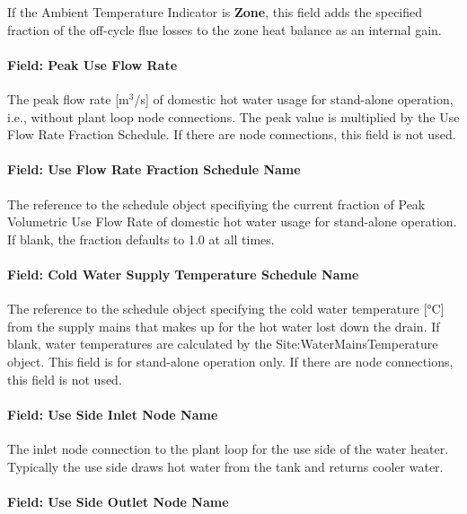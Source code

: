 If the Ambient Temperature Indicator is \textbf{Zone}, this field adds the specified fraction of the off-cycle flue losses to the zone heat balance as an internal gain.

\paragraph{Field: Peak Use Flow Rate}\label{field-peak-use-flow-rate-1}

The peak flow rate {[}m\(^{3}\)/s{]} of domestic hot water usage for stand-alone operation, i.e., without plant loop node connections. The peak value is multiplied by the Use Flow Rate Fraction Schedule. If there are node connections, this field is not used.

\paragraph{Field: Use Flow Rate Fraction Schedule Name}\label{field-use-flow-rate-fraction-schedule-name-1}

The reference to the schedule object specifiying the current fraction of Peak Volumetric Use Flow Rate of domestic hot water usage for stand-alone operation. If blank, the fraction defaults to 1.0 at all times.

\paragraph{Field: Cold Water Supply Temperature Schedule Name}\label{field-cold-water-supply-temperature-schedule-name-1}

The reference to the schedule object specifying the cold water temperature {[}°C{]} from the supply mains that makes up for the hot water lost down the drain. If blank, water temperatures are calculated by the Site:WaterMainsTemperature object. This field is for stand-alone operation only. If there are node connections, this field is not used.

\paragraph{Field: Use Side Inlet Node Name}\label{field-use-side-inlet-node-name-1-000}

The inlet node connection to the plant loop for the use side of the water heater. Typically the use side draws hot water from the tank and returns cooler water.

\paragraph{Field: Use Side Outlet Node Name}\label{field-use-side-outlet-node-name-1-000}

